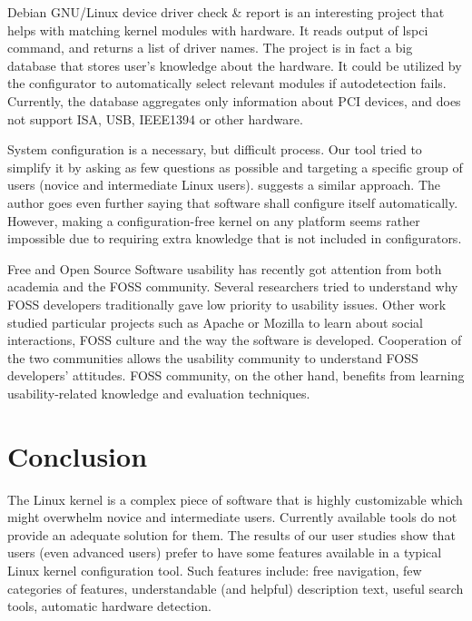 \documentclass{chi2009}
\begin{document}
Debian GNU/Linux device driver check \& report \cite{muto:check:2010} is an interesting project that helps with matching kernel modules with hardware. It reads
output of \textsf{lspci} command, and returns a list of driver names. The project is in fact a big database that stores user's knowledge about the hardware. It
could be utilized by the configurator to automatically select relevant modules if autodetection fails. Currently, the database aggregates only information about
PCI devices, and does not support ISA, USB, IEEE1394 or other hardware.

System configuration is a necessary, but difficult process. Our tool tried to simplify it by asking as few questions as possible and targeting a specific group
of users (novice and intermediate Linux users). \cite{spillers:config:2010} suggests a similar approach. The author goes even further saying that software shall
configure itself automatically. However, making a configuration-free kernel on any platform seems rather impossible due to requiring extra knowledge that is not
included in configurators.

Free and Open Source Software usability has recently got attention from both academia and the FOSS community. Several researchers
\cite{nichols:usability:2003, andreasen:usability:2006} tried to understand why FOSS developers traditionally gave low priority to usability issues. Other work
studied particular projects such as Apache \cite{mockus:apache:2000} or Mozilla \cite{mockus:mozilla:2002} to learn about social interactions, FOSS culture and
the way the software is developed. Cooperation of the two communities allows the usability community to understand FOSS developers' attitudes. FOSS community,
on the other hand, benefits from learning usability-related knowledge and evaluation techniques.

\section{Conclusion}\label{sec:conclusion}
The Linux kernel is a complex piece of software that is highly customizable which might overwhelm novice and intermediate users. Currently available tools do
not provide an adequate solution for them. The results of our user studies show that users (even advanced users) prefer to have some features available in a
typical Linux kernel configuration tool. Such features include: free navigation, few categories of features, understandable (and helpful) description text,
useful search tools, automatic hardware detection.



\end{document}
